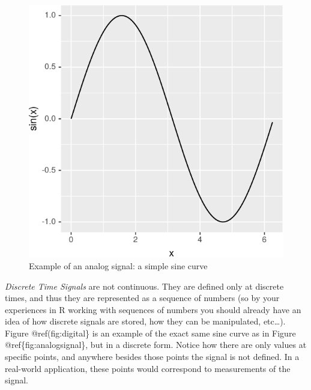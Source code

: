 \documentclass[]{krantz}
\begin{document}
\begin{figure}
\centering
\includegraphics{bookdown_files/figure-latex/analogsignal-1.pdf}
\caption{\label{fig:analogsignal}Example of an analog signal: a simple sine curve}
\end{figure}

\emph{Discrete Time Signals} are not continuous. They are defined only at discrete times, and thus they are represented as a sequence of numbers (so by your experiences in R working with sequences of numbers you should already have an idea of how discrete signals are stored, how they can be manipulated, etc\ldots{}). Figure @ref(fig:digital\} is an example of the exact same sine curve as in Figure @ref\{fig:analogsignal\}, but in a discrete form. Notice how there are only values at specific points, and anywhere besides those points the signal is not defined. In a real-world application, these points would correspond to measurements of the signal.
\end{document}
